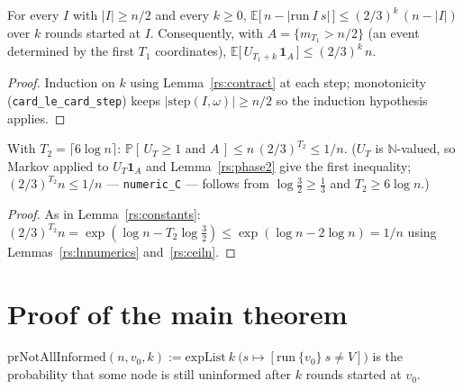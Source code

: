 \begin{lemma}[Phase 2]\label{rs:phase2}
  \rocqok
  For every $I$ with $|I| \ge n/2$ and every $k \ge 0$,
  $\mathbb{E}\bigl[\, n - |\mathrm{run}\ I\ s| \,\bigr] \le (2/3)^{k}\,(n - |I|)$
  over $k$ rounds started at $I$. Consequently, with
  $A = \{m_{T_1} > n/2\}$ (an event determined by the first $T_1$
  coordinates), $\mathbb{E}\bigl[\, U_{T_1 + k}\, \mathbf{1}_A \,\bigr] \le
  (2/3)^{k}\, n$.
\end{lemma}
\begin{proof}
  \rocqok
  Induction on $k$ using Lemma~\ref{rs:contract} at each step;
  monotonicity (\texttt{card\_le\_card\_step}) keeps
  $|\mathrm{step}(I,\omega)| \ge n/2$ so the induction hypothesis applies.
\end{proof}

\begin{corollary}\label{rs:phase2cor}
  \rocqok
  With $T_2 = \lceil 6 \log n \rceil$: $\mathbb{P}[\, U_T \ge 1 \text{ and } A \,]
    \le n\,(2/3)^{T_2} \le 1/n$. ($U_T$ is $\mathbb{N}$-valued, so Markov
  applied to $U_T \mathbf{1}_A$ and Lemma~\ref{rs:phase2} give the first
  inequality; $(2/3)^{T_2} n \le 1/n$ --- \texttt{numeric\_C} --- follows
  from $\log\tfrac32 \ge \tfrac13$ and $T_2 \ge 6\log n$.)
\end{corollary}
\begin{proof}
  \rocqok
  As in Lemma~\ref{rs:constants}: $(2/3)^{T_2} n = \exp(\log n - T_2
  \log\tfrac32) \le \exp(\log n - 2\log n) = 1/n$ using
  Lemmas~\ref{rs:lnnumerics} and~\ref{rs:ceiln}.
\end{proof}

\section{Proof of the main theorem}\label{rs:sec:proof-main}

\begin{definition}\label{rs:prNotAllInformed}
  \rocqok
  $\mathrm{prNotAllInformed}(n,v_0,k) :=
  \mathrm{expList}\ k\ \bigl(s \mapsto [\mathrm{run}\ \{v_0\}\ s \ne V]\bigr)$
  is the probability that some node is still uninformed after $k$ rounds
  started at $v_0$.
\end{definition}

